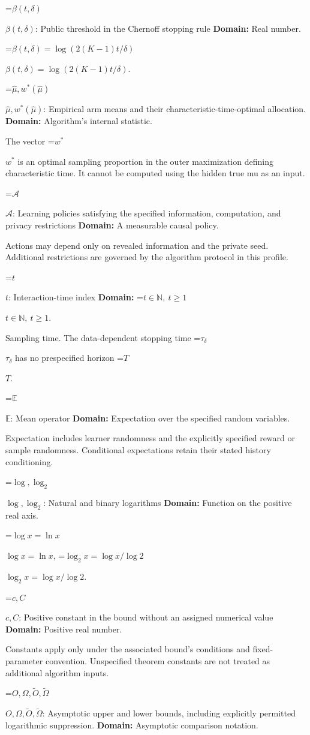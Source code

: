 \documentclass[10pt,a4paper]{article}
\newcommand{\AtlasMath}[1]{\par\begingroup\centering\setbox0=\hbox{$\displaystyle #1$}\ifdim\wd0>1.4\linewidth\typeout{ATLAS WIDE FORMULA: \the\wd0}\fi\ifdim\wd0>\linewidth\resizebox{\linewidth}{!}{\box0}\else\box0\fi\par\endgroup}
\newcommand{\AtlasInlineMath}[1]{\begingroup\setbox0=\hbox{$#1$}\ifdim\wd0>.4\linewidth\endgroup\AtlasMath{#1}\else\endgroup$#1$\fi}
\begin{document}
\AtlasInlineMath{\beta(t,\delta)}: Public threshold in the Chernoff stopping rule \textbf{Domain:} Real number.

\AtlasInlineMath{\beta(t,\delta)=\log(2(K-1)t/\delta)}.

\AtlasInlineMath{\widehat\mu,w^*(\widehat\mu)}: Empirical arm means and their characteristic-time-optimal allocation. \textbf{Domain:} Algorithm's internal statistic.

The vector \AtlasInlineMath{w^*} is an optimal sampling proportion in the outer maximization defining characteristic time. It cannot be computed using the hidden true mu as an input.

\AtlasInlineMath{\mathcal A}: Learning policies satisfying the specified information, computation, and privacy restrictions \textbf{Domain:} A measurable causal policy.

Actions may depend only on revealed information and the private seed. Additional restrictions are governed by the algorithm protocol in this profile.

\AtlasInlineMath{t}: Interaction-time index \textbf{Domain:} \AtlasInlineMath{t\in\mathbb N,\ t\ge1}.

Sampling time. The data-dependent stopping time \AtlasInlineMath{\tau_\delta} has no prespecified horizon \AtlasInlineMath{T}.

\AtlasInlineMath{\mathbb E}: Mean operator \textbf{Domain:} Expectation over the specified random variables.

Expectation includes learner randomness and the explicitly specified reward or sample randomness. Conditional expectations retain their stated history conditioning.

\AtlasInlineMath{\log,\log_2}: Natural and binary logarithms \textbf{Domain:} Function on the positive real axis.

\AtlasInlineMath{\log x=\ln x}, \AtlasInlineMath{\log_2x=\log x/\log2}.

\AtlasInlineMath{c,C}: Positive constant in the bound without an assigned numerical value \textbf{Domain:} Positive real number.

Constants apply only under the associated bound’s conditions and fixed-parameter convention. Unspecified theorem constants are not treated as additional algorithm inputs.

\AtlasInlineMath{O,\Omega,\widetilde O,\widetilde\Omega}: Asymptotic upper and lower bounds, including explicitly permitted logarithmic suppression. \textbf{Domain:} Asymptotic comparison notation.
\end{document}
